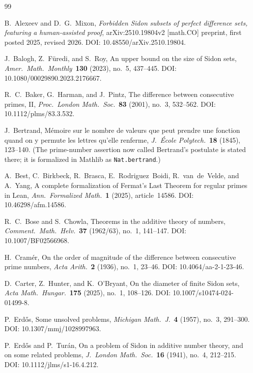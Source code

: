 \documentclass[11pt,a4paper]{article}
\begin{document}
\begin{thebibliography}{99}

B.~Alexeev and D.~G.~Mixon,
\emph{Forbidden Sidon subsets of perfect difference sets, featuring a
human-assisted proof},
arXiv:2510.19804v2 [math.CO] preprint, first posted 2025, revised 2026.
DOI: 10.48550/arXiv.2510.19804.

J.~Balogh, Z.~F\"uredi, and S.~Roy,
An upper bound on the size of Sidon sets,
\emph{Amer.\ Math.\ Monthly}\ \textbf{130} (2023), no.~5, 437--445.
DOI: 10.1080/00029890.2023.2176667.

R.~C.~Baker, G.~Harman, and J.~Pintz,
The difference between consecutive primes, {II},
\emph{Proc.\ London Math.\ Soc.}\ \textbf{83} (2001), no.~3, 532--562.
DOI: 10.1112/plms/83.3.532.

J.~Bertrand,
M\'emoire sur le nombre de valeurs que peut prendre une fonction quand on y
permute les lettres qu'elle renferme,
\emph{J.\ \'Ecole Polytech.}\ \textbf{18} (1845), 123--140.
(The prime-number assertion now called Bertrand's postulate is stated there; it
is formalized in Mathlib as \texttt{Nat.bertrand}.)

A.~Best, C.~Birkbeck, R.~Brasca, E.~Rodriguez~Boidi, R.~van~de~Velde, and A.~Yang,
A complete formalization of Fermat's Last Theorem for regular primes in Lean,
\emph{Ann.\ Formalized Math.}\ \textbf{1} (2025), article~14586.
DOI: 10.46298/afm.14586.

R.~C.~Bose and S.~Chowla,
Theorems in the additive theory of numbers,
\emph{Comment.\ Math.\ Helv.}\ \textbf{37} (1962/63), no.~1, 141--147.
DOI: 10.1007/BF02566968.

H.~Cram\'er,
On the order of magnitude of the difference between consecutive prime numbers,
\emph{Acta Arith.}\ \textbf{2} (1936), no.~1, 23--46.
DOI: 10.4064/aa-2-1-23-46.

D.~Carter, Z.~Hunter, and K.~O'Bryant,
On the diameter of finite Sidon sets,
\emph{Acta Math.\ Hungar.}\ \textbf{175} (2025), no.~1, 108--126.
DOI: 10.1007/s10474-024-01499-8.

P.~Erd\H{o}s,
Some unsolved problems,
\emph{Michigan Math.\ J.}\ \textbf{4} (1957), no.~3, 291--300.
DOI: 10.1307/mmj/1028997963.

P.~Erd\H{o}s and P.~Tur\'an,
On a problem of Sidon in additive number theory, and on some related problems,
\emph{J.\ London Math.\ Soc.}\ \textbf{16} (1941), no.~4, 212--215.
DOI: 10.1112/jlms/s1-16.4.212.


\end{thebibliography}
\end{document}
